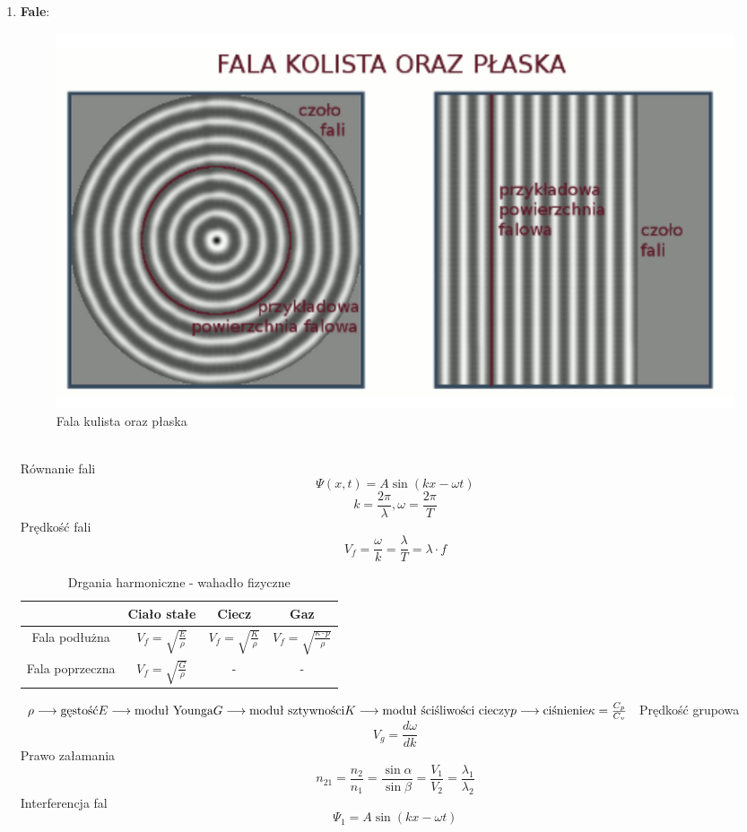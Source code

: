 \documentclass{article}
\begin{document}
\begin{enumerate}
		
		
		\item \textbf{Fale}:
		\begin{figure}[h]
			\centering
			\includegraphics[width=0.5 \textwidth]{fale.png}
			\caption{Fala kulista oraz płaska}
			\label{fig:fale}
		\end{figure}
		\\
		Równanie fali
		\[
		\varPsi(x, t) = A \sin (kx - \omega t)
		\]
		\[
		k = \frac{2 \pi}{\lambda}, \omega = \frac{2 \pi}{T}
		\]
		Prędkość fali
		\[
		V_f = \frac{\omega}{k} = \frac{\lambda}{T} = \lambda \cdot f
		\]
		\newpage
		\begin{table}[h]
			\centering
			\caption{Drgania harmoniczne - wahadło fizyczne}
			\label{tab:Fale w ośrodkach sprężystych}
			\begin{tabular}{|c|c|c|c|}
				\hline
				& \textbf{Ciało stałe} & \textbf{Ciecz} & \textbf{Gaz} \\
				\hline
				Fala podłużna & $V_f = \sqrt{\frac{E}{\rho}}$ & $V_f = \sqrt{\frac{K}{\rho}}$ & $V_f = \sqrt{\frac{\kappa \cdot p}{\rho}}$ \\
				\hline
				Fala poprzeczna & $V_f = \sqrt{\frac{G}{\rho}}$ & - & - \\
				\hline
			\end{tabular}
		\end{table}
		$
		\rho \longrightarrow \text{gęstość} \\
		E \longrightarrow \text{moduł Younga} \\
		G \longrightarrow \text{moduł sztywności} \\
		K \longrightarrow \text{moduł ściśliwości cieczy} \\
		p \longrightarrow \text{ciśnienie} \\
		\kappa = \frac{C_p}{C_v} \\ \\
		$
		Prędkość grupowa
		\[
		V_g = \frac{d \omega}{dk}
		\]
		Prawo załamania
		\[
		n_{21} = \frac{n_2}{n_1} = \frac{\sin \alpha}{\sin \beta} = \frac{V_1}{V_2} = \frac{\lambda_1}{\lambda_2}
		\]
		Interferencja fal
		\[
		\varPsi_1 = A \sin (kx - \omega t)
		\]
		\[
\]
\end{enumerate}
\end{document}
